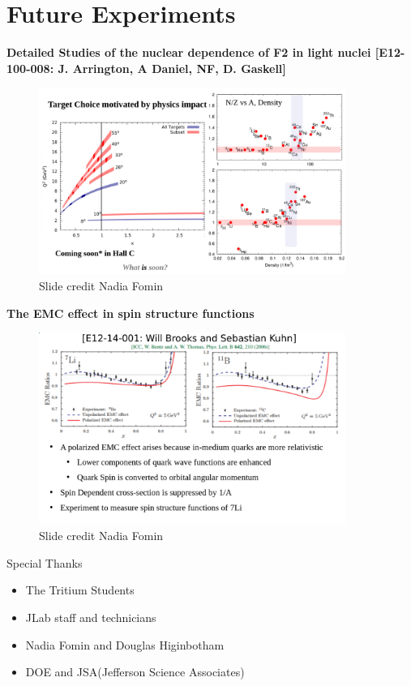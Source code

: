 \documentclass[12pt,usenames,dvipsnames]{beamer}
\begin{document}
\section{Future Experiments}
\begin{frame}{}

\small{\textbf{Detailed Studies of the nuclear dependence of F2 in light nuclei 
	[E12-100-008: J. Arrington, A Daniel, NF, D. Gaskell]}}
\begin{figure}
	\includegraphics[width=10cm]{../images/moreEMC.png}
	\caption*{Slide credit Nadia Fomin}
\end{figure}
\end{frame}
\begin{frame}{}

\centering \textbf{The EMC effect in spin structure functions}
\begin{figure}
	\includegraphics[width=10cm]{../images/moreEMC1.png}
	\caption*{Slide credit Nadia Fomin}
\end{figure}

\end{frame}
\begin{frame}{}
\begin{block}{Special Thanks}
	\begin{itemize}
		\item The Tritium Students 
		\item JLab staff and technicians
		\item Nadia Fomin and Douglas Higinbotham
		\item DOE and JSA(Jefferson Science Associates)
	\end{itemize}
\end{block}
\end{frame}
\end{document}
